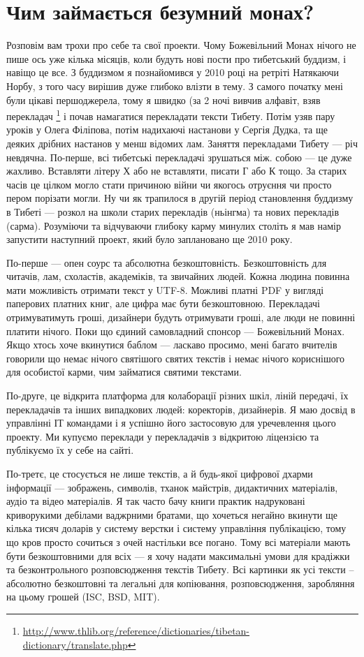 \section{Чим займається безумний монах?}

Розповім вам трохи про себе та свої проекти.
Чому Божевільний Монах нічого не пише ось уже
кілька місяців, коли будуть нові пости про
тибетський буддизм, і навіщо це все. З
буддизмом я познайомився у 2010 році на ретріті
Натякаючи Норбу, з того часу вирішив дуже глибоко влізти в тему.
З самого початку мені були цікаві першоджерела,
тому я швидко (за 2 ночі вивчив алфавіт, взяв
перекладач \footnote{\url{http://www.thlib.org/reference/dictionaries/tibetan-dictionary/translate.php}}
і почав намагатися перекладати тексти Тибету.
Потім узяв пару уроків у Олега Філіпова, потім
надихаючі настанови у Сергія Дудка, та ще
деяких дрібних настанов у менш відомих лам.
Заняття перекладами Тибету --- річ невдячна.
По-перше, всі тибетські перекладачі зрушаться між.
собою --- це дуже жахливо. Вставляти літеру Х або
не вставляти, писати Г або К тощо.
За старих часів це цілком могло стати причиною
війни чи якогось отруєння чи просто пером
порізати могли. Ну чи як трапилося в другій
період становлення буддизму в Тибеті --- розкол
на школи старих перекладів (ньінгма) та нових
перекладів (сарма). Розуміючи та відчуваючи глибоку
карму минулих століть я мав намір запустити
наступний проект, який було заплановано ще 2010 року.

По-перше — опен соурс та абсолютна безкоштовність.
Безкоштовність для читачів, лам, схоластів, академіків,
та звичайних людей. Кожна людина повинна мати можливість
отримати текст у UTF-8. Можливі платні PDF у вигляді
паперових платних книг, але цифра має бути безкоштовною.
Перекладачі отримуватимуть гроші, дизайнери будуть
отримувати гроші, але люди не повинні платити нічого.
Поки що єдиний самовладний спонсор --- Божевільний Монах.
Якщо хтось хоче вкинутися баблом --- ласкаво просимо,
мені багато вчителів говорили що немає нічого святішого
святих текстів і немає нічого кориснішого для особистої
карми, чим займатися святими текстами.

По-друге, це відкрита платформа для колаборації різних шкіл, ліній передачі, їх перекладачів та інших випадкових людей: коректорів, дизайнерів. Я маю досвід в управлінні ІТ командами і я успішно його застосовую для уречевлення цього проекту. Ми купуємо переклади у перекладачів з відкритою ліцензією та публікуємо їх у себе на сайті.

По-третє, це стосується не лише текстів, а й будь-якої цифрової дхарми інформації — зображень, символів, тханок майстрів, дидактичних матеріалів, аудіо та відео матеріалів. Я так часто бачу книги практик надруковані криворукими дебілами ваджрними братами, що хочеться негайно вкинути ще кілька тисяч доларів у систему верстки і систему управління публікацією, тому що кров просто сочиться з очей настільки все погано. Тому всі матеріали мають бути безкоштовними для всіх — я хочу надати максимальні умови для крадіжки та безконтрольного розповсюдження текстів Тибету. Всі картинки як усі тексти – абсолютно безкоштовні та легальні для копіювання, розповсюдження, заробляння на цьому грошей (ISC, BSD, MIT).

